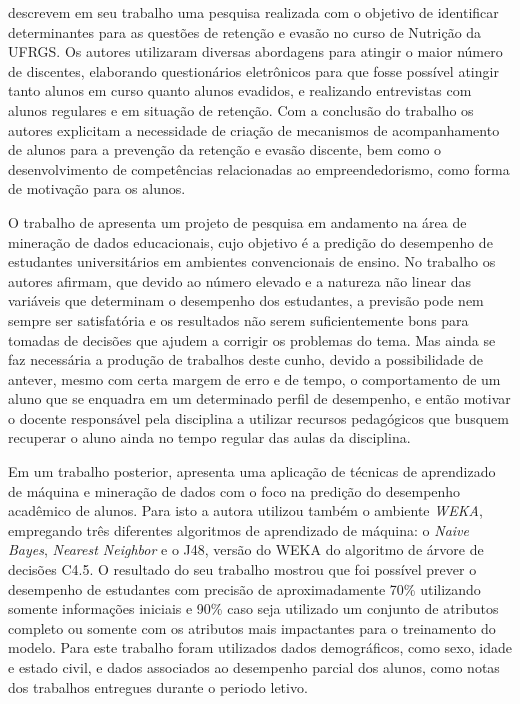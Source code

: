  descrevem em seu trabalho uma pesquisa realizada com o objetivo de identificar determinantes para as questões de retenção e evasão no curso de Nutrição da UFRGS. 
Os autores utilizaram diversas abordagens para atingir o maior número de discentes, elaborando questionários eletrônicos para que fosse possível atingir tanto alunos em curso quanto alunos evadidos, e realizando entrevistas com alunos regulares e em situação de retenção. 
Com a conclusão do trabalho os autores explicitam a necessidade de criação de mecanismos de acompanhamento de alunos para a prevenção da retenção e evasão discente, bem como o desenvolvimento de competências relacionadas ao empreendedorismo, como forma de motivação para os alunos.

O trabalho de  apresenta um projeto de pesquisa em andamento na área de mineração de dados educacionais, cujo objetivo é a predição do desempenho de estudantes universitários em ambientes convencionais de ensino. 
No trabalho os autores afirmam, que devido ao número elevado e a natureza não linear das variáveis que determinam o desempenho dos estudantes, a previsão pode nem sempre ser satisfatória e os resultados não serem suficientemente bons para tomadas de decisões que ajudem a corrigir os problemas do tema. 
Mas ainda se faz necessária a produção de trabalhos deste cunho, devido a possibilidade de antever, mesmo com certa margem de erro e de tempo, o comportamento de um aluno que se enquadra em um determinado perfil de desempenho, e então motivar o docente responsável pela disciplina a utilizar recursos pedagógicos que busquem recuperar o aluno ainda no tempo regular das aulas da disciplina.

Em um trabalho posterior,  apresenta uma aplicação de técnicas de aprendizado de máquina e mineração de dados com o foco na predição do desempenho acadêmico de alunos. 
Para isto a autora utilizou também o ambiente \textit{WEKA}, empregando três diferentes algoritmos de aprendizado de máquina: o \textit{Naive Bayes}, \textit{Nearest Neighbor} e o J48, versão do WEKA do algoritmo de árvore de decisões C4.5. 
O resultado do seu trabalho mostrou que foi possível prever o desempenho de estudantes com precisão de aproximadamente 70\% utilizando somente informações iniciais e 90\% caso seja utilizado um conjunto de atributos completo ou somente com os atributos mais impactantes para o treinamento do modelo.
Para este trabalho foram utilizados dados demográficos, como sexo, idade e estado civil, e dados associados ao desempenho parcial dos alunos, como notas dos trabalhos entregues durante o periodo letivo.

